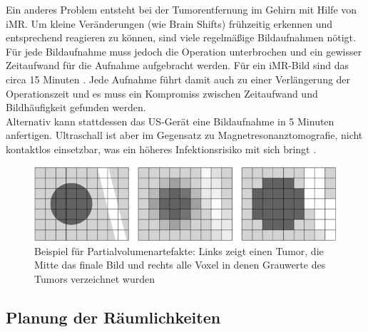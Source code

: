 Ein anderes Problem entsteht bei der Tumorentfernung im Gehirn mit Hilfe von iMR. Um kleine Veränderungen (wie Brain Shifts) frühzeitig erkennen und entsprechend reagieren zu können, sind viele regelmäßige Bildaufnahmen nötigt. Für jede Bildaufnahme muss jedoch die Operation unterbrochen und ein gewisser Zeitaufwand für die Aufnahme aufgebracht werden. Für ein iMR-Bild sind das circa 15 Minuten \cite{BrainShiftInTumorResection}. Jede Aufnahme führt damit auch zu einer Verlängerung der Operationszeit und es muss ein Kompromiss zwischen Zeitaufwand und Bildhäufigkeit gefunden werden.\\
Alternativ kann stattdessen das US-Gerät eine Bildaufnahme in 5 Minuten anfertigen. Ultraschall ist aber im Gegensatz zu Magnetresonanztomografie, nicht kontaktlos einsetzbar, was ein höheres Infektionsrisiko mit sich bringt \cite{BrainShiftInTumorResection}.

\begin{figure} [H]
	\includegraphics[scale = 0.7]{Content/Pictures/partial.png}
	\caption{Beispiel für Partialvolumenartefakte: Links zeigt einen Tumor, die Mitte das finale Bild und rechts alle Voxel in denen Grauwerte des Tumors verzeichnet wurden \cite{DerDigitaleOperationssaal}}
	\label{fig:partial}
\end{figure}

\subsection{Planung der Räumlichkeiten}

